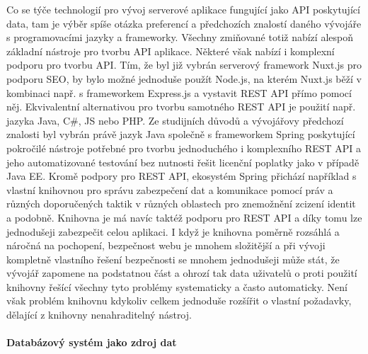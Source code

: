 			Co se týče technologií pro vývoj serverové aplikace fungující jako \ac{API} poskytující data, tam je výběr spíše
			otázka preferencí a předchozích znalostí daného vývojáře s programovacími jazyky a frameworky.
			Všechny zmiňované totiž nabízí alespoň základní nástroje pro tvorbu \ac{API} aplikace.
			Některé však nabízí i komplexní podporu pro tvorbu \ac{API}.
			Tím, že byl již vybrán serverový framework Nuxt.js pro podporu \Ac{SEO}, by bylo možné jednoduše použít Node.js,
			na kterém Nuxt.js běží v kombinaci např. s frameworkem Express.js a vystavit \Ac{REST} \ac{API} přímo pomocí něj.
			Ekvivalentní alternativou pro tvorbu samotného \Ac{REST} \ac{API} je použití např. jazyka Java, C\#, \ac{JS}
			nebo \Ac{PHP}.
			Ze studijních důvodů a vývojářovy předchozí znalosti byl vybrán právě jazyk Java společně s frameworkem
			Spring poskytující pokročilé nástroje potřebné pro tvorbu jednoduchého i komplexního \Ac{REST} \ac{API} a jeho
			automatizované testování bez nutnosti řešit licenční poplatky jako v případě Java EE.
			Kromě podpory pro \ac{REST} \ac{API}, ekosystém Spring přichází například s vlastní knihovnou pro správu
			zabezpečení dat a komunikace pomocí práv a různých doporučených taktik v různých oblastech pro znemožnění zcizení
			identit a podobně.
			Knihovna je má navíc taktéž podporu pro \ac{REST} \ac{API} a díky tomu lze jednodušeji zabezpečit celou aplikaci.
			I když je knihovna poměrně rozsáhlá a náročná na pochopení, bezpečnost webu je mnohem složitější a při vývoji
			kompletně vlastního řešení bezpečnosti se mnohem jednodušeji může stát, že vývojář zapomene na podstatnou část a ohrozí tak
			data uživatelů o proti použití knihovny řešící všechny tyto problémy systematicky a často automaticky.
			Není však problém knihovnu kdykoliv celkem jednoduše rozšířit o vlastní požadavky, dělající z knihovny
			nenahraditelný nástroj.


			\paragraph{Databázový systém jako zdroj dat}

